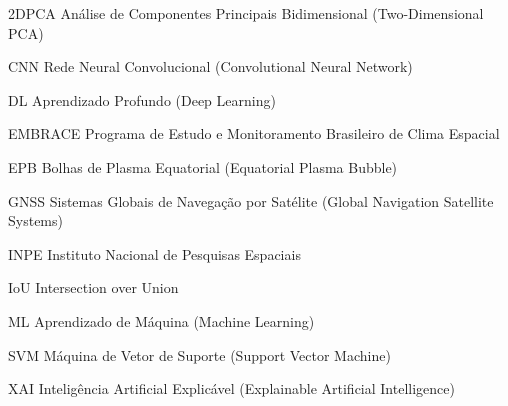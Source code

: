 \documentclass[
   12pt,
   oneside,
   a4paper,
   brazil
]{abntex2}
\begin{document}
\imprimircapa
\imprimirfolhaderosto*

\listoffigures
\listoftables

\begin{siglas}
  \item[2DPCA] Análise de Componentes Principais Bidimensional (Two-Dimensional PCA)
  \item[CNN] Rede Neural Convolucional (Convolutional Neural Network)
  \item[DL] Aprendizado Profundo (Deep Learning)
  \item[EMBRACE] Programa de Estudo e Monitoramento Brasileiro de Clima Espacial
  \item[EPB] Bolhas de Plasma Equatorial (Equatorial Plasma Bubble)
  \item[GNSS] Sistemas Globais de Navegação por Satélite (Global Navigation Satellite Systems)
  \item[INPE] Instituto Nacional de Pesquisas Espaciais
  \item[IoU] Intersection over Union
  \item[ML] Aprendizado de Máquina (Machine Learning)
  \item[SVM] Máquina de Vetor de Suporte (Support Vector Machine)
  \item[XAI] Inteligência Artificial Explicável (Explainable Artificial Intelligence)
\end{siglas}

\tableofcontents









\end{document}
